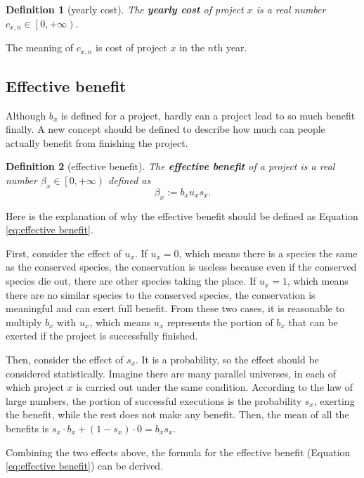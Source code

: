 \documentclass{article}
\newtheorem{definition}{Definition}
\begin{document}
\begin{definition}[yearly cost]
The \textbf{yearly cost} of project $x$ is a real number $c_{x,n}\in\left[0,+\infty\right)$.
\end{definition}

The meaning of $c_{x,n}$ is cost of project $x$ in the $n$th year.

\subsection{Effective benefit}
\label{sec:effective benefit}

Although $b_x$ is defined for a project, hardly can a project lead to so much benefit finally.
A new concept should be defined to describe how much can people actually benefit from finishing the project.

\begin{definition}[effective benefit]
The \textbf{effective benefit} of a project is a real number $\beta_x\in\left[0,+\infty\right)$ defined as
\begin{equation}
\label{eq:effective benefit}
\beta_x:=b_xu_xs_x.
\end{equation}
\end{definition}

Here is the explanation of why the effective benefit should be defined as Equation \ref{eq:effective benefit}.

First, consider the effect of $u_x$.
If $u_x=0$, which means there is a species the same as the conserved species,
the conservation is useless because even if the conserved species die out, there are other species taking the place.
If $u_x=1$, which means there are no similar species to the conserved species,
the conservation is meaningful and can exert full benefit.
From these two cases, it is reasonable to multiply $b_x$ with $u_x$,
which means $u_x$ represents the portion of $b_x$ that can be exerted if the project is successfully finished.

Then, consider the effect of $s_x$.
It is a probability, so the effect should be considered statistically.
Imagine there are many parallel universes, in each of which project $x$ is carried out under the same condition.
According to the law of large numbers, the portion of successful executions is the probability $s_x$, exerting the benefit,
while the rest does not make any benefit.
Then, the mean of all the benefits is $s_x\cdot b_x+\left(1-s_x\right)\cdot0=b_xs_x$.

Combining the two effects above, the formula for the effective benefit (Equation \ref{eq:effective benefit}) can be derived.
\end{document}
